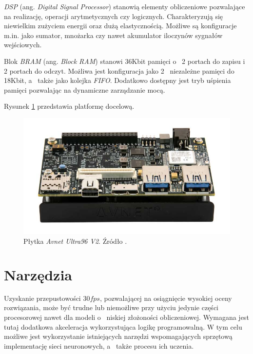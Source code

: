 \emph{DSP} (ang. \emph{Digital Signal Processor}) \cite{dsp} stanowią elementy obliczeniowe pozwalające na realizację, operacji arytmetycznych czy logicznych.
Charakteryzują się niewielkim zużyciem energii oraz dużą elastycznością.
Możliwe są konfiguracje m.in. jako sumator, mnożarka czy nawet akumulator iloczynów sygnałów wejściowych.

Blok \emph{BRAM} (ang. \emph{Block RAM}) \cite{bram} stanowi 36Kbit pamięci o~ 2 portach do zapisu i~ 2 portach do odczyt. 
Możliwa jest konfiguracja jako 2~ niezależne pamięci do 18Kbit, a~ także jako kolejka \emph{FIFO}.
Dodatkowo dostępny jest tryb uśpienia pamięci pozwalając na dynamiczne zarządzanie mocą. 

Rysunek \ref{fig:ultra96} przedstawia platformę docelową.

\begin{figure}
    \centering
    \includegraphics[width=\linewidth]{images/ultra96v2.png}
    \caption{Płytka \emph{Avnet Ultra96 V2}. Źródło \cite{avnet_ultra96}.}
    \label{fig:ultra96}
\end{figure}

\section{Narzędzia}
\label{ch:tools}
Uzyskanie przepustowości $30 fps$, pozwalającej na osiągnięcie wysokiej oceny rozwiązania, może być trudne lub niemożliwe  przy użyciu jedynie części procesorowej nawet dla modeli o~ niskiej złożoności obliczeniowej. 
Wymagana jest tutaj dodatkowa akceleracja wykorzystująca logikę programowalną. 
W tym celu możliwe jest wykorzystanie istniejących narzędzi wspomagających sprzętową implementację sieci neuronowych, a~ także procesu ich uczenia. 

